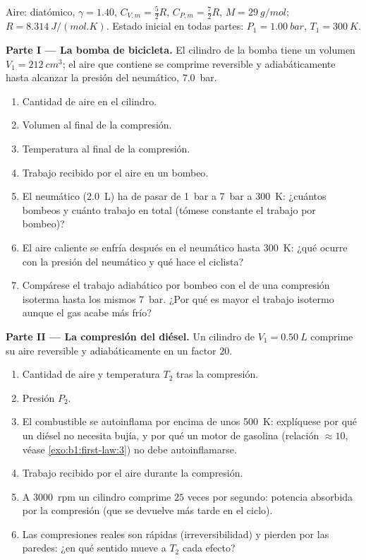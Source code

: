 \begin{problem}
\label{pb:b1:first-law:1}
Aire:  diatómico, $\gamma = 1.40$, $C_{V,m} = \tfrac52 R$, $C_{P,m} =
\tfrac72 R$, $M = \qty{29}{g/mol}$; $R = \qty{8.314}{J/(mol.K)}$. Estado
inicial en todas partes: $P_1 = \qty{1.00}{bar}$, $T_1 = \qty{300}{K}$.

\medskip
\noindent\textbf{Parte I --- La bomba de bicicleta.}
El cilindro de la bomba tiene un volumen $V_1 = \qty{212}{cm^3}$; el aire
que contiene se comprime reversible y adiabáticamente hasta alcanzar la
presión del neumático, \qty{7.0}{bar}.
\begin{enumerate}
  \item Cantidad de aire en el cilindro.
  \item Volumen al final de la compresión.
  \item Temperatura al final de la compresión.
  \item Trabajo recibido por el aire en un bombeo.
  \item El neumático (\qty{2.0}{L}) ha de pasar de \qty{1}{bar} a
        \qty{7}{bar} a \qty{300}{K}: ¿cuántos bombeos y cuánto trabajo en
        total (tómese constante el trabajo por bombeo)?
  \item El aire caliente se enfría después en el neumático hasta
        \qty{300}{K}: ¿qué ocurre con la presión del neumático y qué hace
        el ciclista?
  \item Compárese el trabajo adiabático por bombeo con el de una
        compresión isoterma hasta los mismos \qty{7}{bar}. ¿Por qué es
        mayor el trabajo isotermo aunque el gas acabe más frío?
\end{enumerate}

\medskip
\noindent\textbf{Parte II --- La compresión del diésel.}
Un cilindro de $V_1 = \qty{0.50}{L}$ comprime su aire reversible y
adiabáticamente en un factor $20$.
\begin{enumerate}[resume]
  \item Cantidad de aire y temperatura $T_2$ tras la compresión.
  \item Presión $P_2$.
  \item El combustible se autoinflama por encima de unos \qty{500}{K}:
        explíquese por qué un diésel no necesita bujía, y por qué un motor
        de gasolina (relación $\approx 10$, véase \cref{exo:b1:first-law:3})
        no debe autoinflamarse.
  \item Trabajo recibido por el aire durante la compresión.
  \item A \qty{3000}{rpm} un cilindro comprime $25$ veces por segundo:
        potencia absorbida por la compresión (que se devuelve más tarde en
        el ciclo).
  \item Las compresiones reales son rápidas (irreversibilidad) y pierden
         por las paredes: ¿en qué sentido mueve a $T_2$ cada efecto?
\end{enumerate}


\end{problem}
